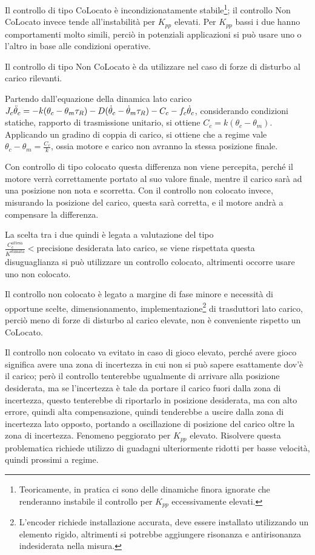 
Il controllo di tipo CoLocato è incondizionatamente stabile\footnote{Teoricamente, in pratica ci sono delle dinamiche finora ignorate che renderanno instabile il controllo per \(K_{pp}\) eccessivamente elevati.}; il controllo Non CoLocato invece tende all'instabilità per \(K_{pp}\) elevati.
Per \(K_{pp}\) bassi i due hanno comportamenti molto simili, perciò in potenziali applicazioni si può usare uno o l'altro in base alle condizioni operative.

Il controllo di tipo Non CoLocato è da utilizzare nel caso di forze di disturbo al carico rilevanti. 

Partendo dall'equazione della dinamica lato carico \(J_c \Ddot{\theta}_c = -k(\theta_c - \theta_m \tau_R) - D(\dot{\theta}_c - \dot{\theta}_m\tau_R) - C_c - f_c\dot{\theta}_c\), considerando condizioni statiche, rapporto di trasmissione unitario, si ottiene \(C_c = k(\theta_c - \theta_m)\).
Applicando un gradino di coppia di carico, si ottiene che a regime vale \(\theta_c - \theta_m = \frac{C_c}{k}\), ossia motore e carico non avranno la stessa posizione finale.

Con controllo di tipo colocato questa differenza non viene percepita, perché il motore verrà correttamente portato al suo valore finale, mentre il carico sarà ad una posizione non nota e scorretta.
Con il controllo non colocato invece, misurando la posizione del carico, questa sarà corretta, e il motore andrà a compensare la differenza.

La scelta tra i due quindi è legata a valutazione del tipo \(\frac{C_c^\text{attesa}}{K^\text{stimata}} < \text{precisione desiderata lato carico}\), se viene rispettata questa disuguaglianza si può utilizzare un controllo colocato, altrimenti occorre usare uno non colocato.

Il controllo non colocato è legato a margine di fase minore e necessità di opportune scelte, dimensionamento, implementazione\footnote{L'encoder richiede installazione accurata, deve essere installato utilizzando un elemento rigido, altrimenti si potrebbe aggiungere risonanza e antirisonanza indesiderata nella misura.} di trasduttori lato carico, perciò meno di forze di disturbo al carico elevate, non è conveniente rispetto un CoLocato.

Il controllo non colocato va evitato in caso di gioco elevato, perché avere gioco significa avere una zona di incertezza in cui non si può sapere esattamente dov'è il carico; però il controllo tenterebbe ugualmente di arrivare alla posizione desiderata, ma se l'incertezza è tale da portare il carico fuori dalla zona di incertezza, questo tenterebbe di riportarlo in posizione desiderata, ma con alto errore, quindi alta compensazione, quindi tenderebbe a uscire dalla zona di incertezza lato opposto, portando a oscillazione di posizione del carico oltre la zona di incertezza. Fenomeno peggiorato per \(K_{pp}\) elevato.
Risolvere questa problematica richiede utilizzo di guadagni ulteriormente ridotti per basse velocità, quindi prossimi a regime.


